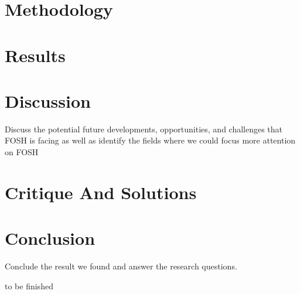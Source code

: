 \documentclass[acmtog]{acmart}
\begin{document}

\section{Methodology}
\label{methodology}



\section{Results}

\section{Discussion}
Discuss the potential future developments, opportunities, and challenges that FOSH is facing as well as identify the fields where we could focus more attention on FOSH  

\section{Critique And Solutions}

\section{Conclusion}
Conclude the result we found and answer the research questions.


\begin{acks}
to be finished
\end{acks}



\end{document}
